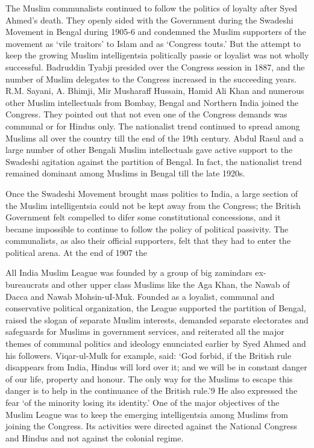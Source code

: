 The Muslim communalists continued to follow the politics of loyalty after Syed Ahmed's death. They openly sided with the Government during the Swadeshi Movement in Bengal during 1905-6 and condemned the Muslim supporters of the movement as `vile traitors' to Islam and as `Congress touts.' But the attempt to keep the growing Muslim intelligentsia politically passie or loyalist was not wholly successful. Badruddin Tyabji presided over the Congress session in 1887, and the number of Muslim delegates to the Congress increased in the succeeding years. R.M. Sayani, A. Bhimji, Mir Musharaff Hussain, Hamid Ali Khan and numerous other Muslim intellectuals from Bombay, Bengal and Northern India joined the Congress. They pointed out that not even one of the Congress demands was communal or for Hindus only. The nationalist trend continued to spread among Muslims all over the country till the end of the 19th century. Abdul Rasul and a large number of other Bengali Muslim intellectuals gave active support to the Swadeshi agitation against the partition of Bengal. In fact, the nationalist trend remained dominant among Muslims in Bengal till the late 1920s. 

Once the Swadeshi Movement brought mass politics to India, a large section of the Muslim intelligentsia could not be kept away from the Congress; the British Government felt compelled to difer some constitutional concessions, and it became impossible to continue to follow the policy of political passivity. The communalists, as also their official supporters, felt that they had to enter the political arena. At the end of 1907 the 

All India Muslim League was founded by a group of big zamindars ex-bureaucrats and other upper class Muslims like the Aga Khan, the Nawab of Dacca and Nawab Mohsin-uI-Muk. Founded as a loyalist, communal and conservative political organization, the League supported the partition of Bengal, raised the slogan of separate Muslim interests, demanded separate electorates and safeguards for Muslims in government services, and reiterated all the major themes of communal politics and ideology enunciated earlier by Syed Ahmed and his followers. Viqar-ul-Mulk for example, said: `God forbid, if the British rule disappears from India, Hindus will lord over it; and we will be in constant danger of our life, property and honour. The only way for the Muslims to escape this danger is to help in the continuance of the British rule.'9 He also expressed the fear `of the minority losing its identity.' One of the major objectives of the Muslim League was to keep the emerging intelligentsia among Muslims from joining the Congress. Its activities were directed against the National Congress and Hindus and not against the colonial regime. 

